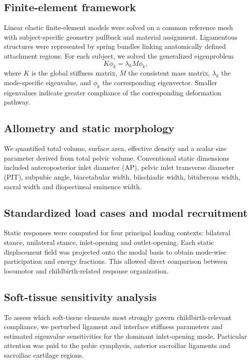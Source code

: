 \documentclass[fleqn,usenatbib]{rsproca_new}
\begin{document}
\subsection{Finite-element framework}
Linear elastic finite-element models were solved on a common reference mesh with subject-specific geometry pullback and material assignment. Ligamentous structures were represented by spring bundles linking anatomically defined attachment regions. For each subject, we solved the generalized eigenproblem
\begin{equation}
K\phi_k = \lambda_k M\phi_k,
\end{equation}
where $K$ is the global stiffness matrix, $M$ the consistent mass matrix, $\lambda_k$ the mode-specific eigenvalue, and $\phi_k$ the corresponding eigenvector. Smaller eigenvalues indicate greater compliance of the corresponding deformation pathway.

\subsection{Allometry and static morphology}
We quantified total volume, surface area, effective density and a scalar size parameter derived from total pelvic volume. Conventional static dimensions included anteroposterior inlet diameter (AP), pelvic inlet transverse diameter (PIT), subpubic angle, biacetabular width, biischiadic width, bituberous width, sacral width and iliopectineal eminence width.

\subsection{Standardized load cases and modal recruitment}
Static responses were computed for four principal loading contexts: bilateral stance, unilateral stance, inlet-opening and outlet-opening. Each static displacement field was projected onto the modal basis to obtain mode-wise participation and energy fractions. This allowed direct comparison between locomotor and childbirth-related response organization.

\subsection{Soft-tissue sensitivity analysis}
To assess which soft-tissue elements most strongly govern childbirth-relevant compliance, we perturbed ligament and interface stiffness parameters and estimated eigenvalue sensitivities for the dominant inlet-opening mode. Particular attention was paid to the pubic symphysis, anterior sacroiliac ligaments and sacroiliac cartilage regions.
\end{document}
